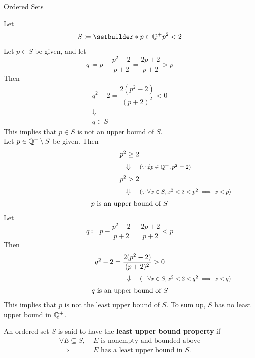 \begin{section}{Ordered Sets}
\begin{example}
    Let
    \[
    S \coloneqq \setbuilder*{p \in \Q^{+}}{p^{2} < 2}
    \]
    Let $p \in S$ be given, and let
    \[
    q \coloneqq p - \dfrac{p^{2} - 2}{p + 2} = \dfrac{2p + 2}{p + 2} > p
    \]
    Then
    \[
    \begin{array}{c}
        q^{2} - 2 = \dfrac{2(p^{2} - 2)}{(p + 2)^{2}} < 0 \\[4mm]
        \Downarrow \\[2mm]
        q \in S
    \end{array}
    \]
    This implies that $p \in S$ is not an upper bound of $S$.
    \\[6mm]
    Let $p \in \mathbb{Q}^{+} \setminus S$ be given. Then
    \[
    \begin{array}{c}
        p^{2} \geq 2 \\[2mm]
        \Downarrow
        \rlap{\quad\footnotesize($\because \nexists p \in \Q^{+}, p^{2} = 2$)} \\[2mm]
        p^{2} > 2 \\[2mm]
        \Downarrow
        \rlap{\quad\footnotesize($\because \forall x \in S, x^{2} < 2 < p^{2} \implies x < p$)} \\[2mm]
        p \text{ is an upper bound of } S
    \end{array}
    \]
    Let 
    \[
    q \coloneqq p - \dfrac{p^{2} - 2}{p + 2} = \dfrac{2p + 2}{p + 2} < p
    \]
    Then
    \[
    \begin{array}{c}
        q^{2} - 2 = \dfrac{2(p^{2} - 2)}{(p + 2)^{2}} > 0 \\[4mm]
        \Downarrow
        \rlap{\quad\footnotesize($\because \forall x \in S, x^{2} < 2 < q^{2} \implies x < q$)} \\[2mm]
        q \text{ is an upper bound of } S
    \end{array}
    \]
    This implies that $p$ is not the least upper bound of $S$. To sum up, $S$ has no least upper bound in $\mathbb{Q}^{+}$.
\end{example}

\bigskip

\begin{definition} \label{def:LeastUpperBoundProperty}
    An ordered set $S$ is said to have the \textbf{least upper bound property} if
    \begin{align*}
        \forall E \subseteq S, \; &E \text{ is nonempty and bounded above} \\
        \implies &E \text{ has a least upper bound in } S.
    \end{align*}
\end{definition}


\end{section}
